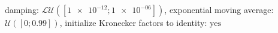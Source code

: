damping: $\mathcal{LU}([\num[scientific-notation=true]{1e-12}; \num[scientific-notation=true]{1e-06}])$, exponential moving average: $\mathcal{U}([\num[scientific-notation=false]{0}; \num[scientific-notation=true]{0.99}])$, initialize Kronecker factors to identity: $\text{yes}$